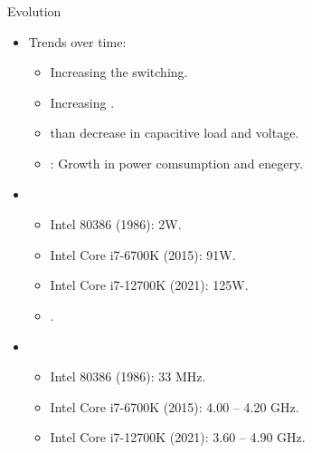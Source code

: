 \begin{frame}[t]{Evolution}
\begin{itemize}
  \item Trends over time:
    \begin{itemize}
      \item Increasing the  switching.
      \item Increasing .
      \item {} than decrease in capacitive load and voltage.
      \item {}: Growth in power comsumption and enegery.
    \end{itemize}

  \item {}
    \begin{itemize}
      \item Intel 80386 (1986): 2W.
      \item Intel Core i7-6700K (2015): 91W.
      \item Intel Core i7-12700K (2021): 125W.
      \item {}.
    \end{itemize}

  \item {}
    \begin{itemize}
      \item Intel 80386 (1986): 33 MHz.
      \item Intel Core i7-6700K (2015): 4.00 -- 4.20 GHz.
      \item Intel Core i7-12700K (2021): 3.60 -- 4.90 GHz.
    \end{itemize}
\end{itemize}
\end{frame}

